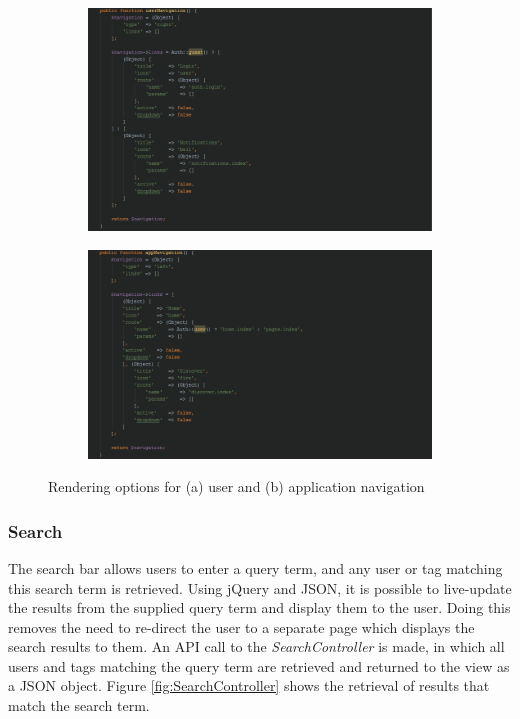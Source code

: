 \begin{figure}[H]
\centering
\begin{subfigure}[b]{1\linewidth}
	\includegraphics[width=1\textwidth]{Images/Implementation/UserNavigation}
	\caption{}
	\label{fig:UserNavigation}
\end{subfigure}
\begin{subfigure}[b]{1\linewidth}
	\includegraphics[width=1\textwidth]{Images/Implementation/AppNavigation}
	\caption{}
	\label{fig:AppNavigation}
\end{subfigure}
\caption{Rendering options for (a) user and (b) application navigation}
\label{fig:LayoutComposerNav}
\end{figure}

\subsubsection{Search}
The search bar allows users to enter a query term, and any user or tag matching this search term is retrieved. Using jQuery and JSON, it is possible to live-update the results from the supplied query term and display them to the user. Doing this removes the need to re-direct the user to a separate page which displays the search results to them. An API call to the \textit{SearchController} is made, in which all users and tags matching the query term are retrieved and returned to the view as a JSON object. Figure \ref{fig:SearchController} shows the retrieval of results that match the search term.

